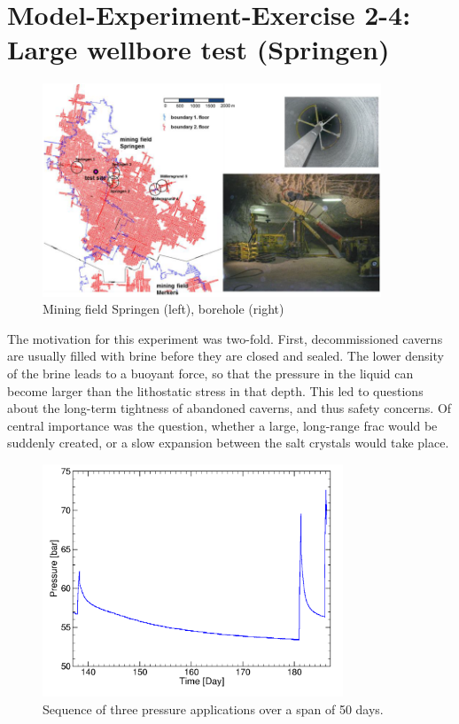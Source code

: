 \section[MEX 2-4: Large wellbore test (Springen)]{Model-Experiment-Exercise 2-4:\\Large wellbore test (Springen)}
\label{sec:mex11}

\begin{figure}[ht]
\centering
\includegraphics[width=0.9\textwidth]{figures/IfG-borehole-overview-small.png}
\caption{Mining field Springen (left), borehole (right)}
\label{fig:largeborehole1}
\end{figure}

The motivation for this experiment was two-fold. First, decommissioned caverns are usually filled with brine before they are closed and sealed. The lower density of the brine leads to a buoyant force, so that the pressure in the liquid can become larger than the lithostatic stress in that depth. This led to questions about the long-term tightness of abandoned caverns, and thus safety concerns. Of central importance was the question, whether a large, long-range frac would be suddenly created, or a slow expansion between the salt crystals would take place. 

\begin{figure}[ht]
\centering
\includegraphics[width=0.8\textwidth]{figures/IfG-Druckkurve-50d.png}
\caption{Sequence of three pressure applications over a span of 50 days.}
\label{fig:largeborehole2}
\end{figure}

